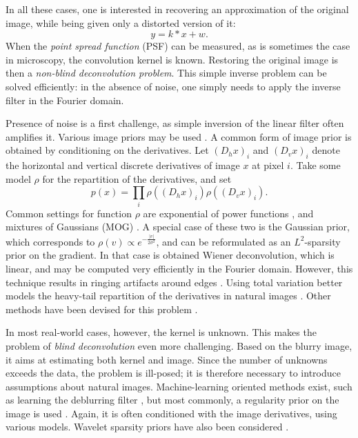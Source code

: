 \documentclass[english,a4paper]{article}
\theoremstyle{plain}
\theoremstyle{definition}
\theoremstyle{remark}
\begin{document}
In all these cases, one is interested in recovering an approximation of the original image, while being given only a distorted version of it:
\[
y = k * x + w.
\]
When the \emph{point spread function} (PSF) can be measured, as is sometimes the case in microscopy, the convolution kernel is known.
Restoring the original image is then a \emph{non-blind deconvolution problem}.
This simple inverse problem can be solved efficiently: in the absence of noise, one simply needs to apply the inverse filter in the Fourier domain.

Presence of noise is a first challenge, as simple inversion of the linear filter often amplifies it.
Various image priors may be used \cite{sun2014good}.
A common form of image prior is obtained by conditioning on the derivatives. Let $(D_h x)_i$ and $(D_v x)_i$ denote the horizontal and vertical discrete derivatives of image $x$ at pixel $i$.
Take some model $\rho$ for the repartition of the derivatives, and set
\[
p(x) = \prod_i \rho((D_h x)_i) \rho((D_v x)_i) .
\]
Common settings for function $\rho$ are exponential of power functions \cite{krishnan2009fast,levin2009understanding}, and mixtures of Gaussians (MOG) \cite{levin2011efficient,fergus2006removing}.
A special case of these two is the Gaussian prior, which corresponds to $\rho(v) \propto e^{-\frac{|v|}{2\sigma^2}}$, and can be reformulated as an $L^2$-sparsity prior on the gradient. In that case is obtained Wiener deconvolution, which is linear, and may be computed very efficiently in the Fourier domain. However, this technique results in ringing artifacts around edges \cite{shan2008high}.
Using total variation better models the heavy-tail repartition of the derivatives in natural images \cite{chan1998total,levi2009using}.
Other methods have been devised for this problem \cite{sun2014good,schmidt2013discriminative}.



In most real-world cases, however, the kernel is unknown. This makes the problem of \emph{blind deconvolution} even more challenging.
Based on the blurry image, it aims at estimating both kernel and image.
Since the number of unknowns exceeds the data, the problem is ill-posed; it is therefore necessary to introduce assumptions about natural images.
Machine-learning oriented methods exist, such as learning the deblurring filter \cite{bell1995information}, but most commonly, a regularity prior on the image is used \cite{krishnan2009fast,fergus2006removing,levin2007blind,levi2009using,levin2011efficient,levin2009understanding,chan1998total}.
Again, it is often conditioned with the image derivatives, using various models. Wavelet sparsity priors have also been considered \cite{jalobeanu2002satellite}.
\end{document}
